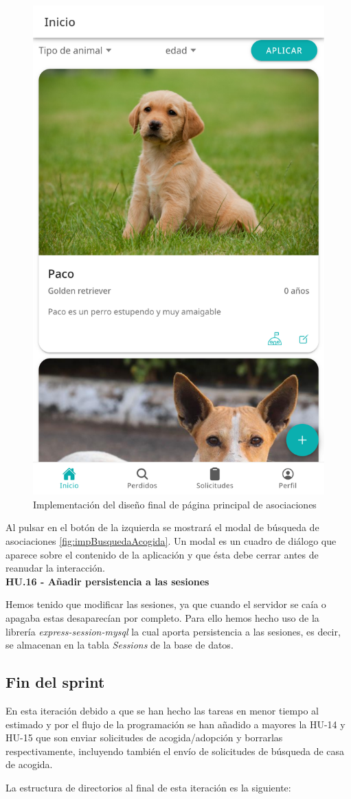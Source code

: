 \begin{figure}[H]
	\centering
	\includegraphics[width=0.31\linewidth]{"sprint 3/homeAsociaciones"}
	\caption{Implementación del diseño final de página principal de asociaciones}
	\label{fig:homeasociaciones}
\end{figure}

Al pulsar en el botón de la izquierda se mostrará el modal de búsqueda de asociaciones \ref{fig:impBusquedaAcogida}. Un modal es un cuadro de diálogo que aparece sobre el contenido de la aplicación y que ésta debe cerrar antes de reanudar la interacción. \\

\Large{\textbf{HU.16 - Añadir persistencia a las sesiones}}

Hemos tenido que modificar las sesiones, ya que cuando el servidor se caía o apagaba estas desaparecían por completo. Para ello hemos hecho uso de la librería \textit{express-session-mysql} \cite{mysqlSession} la cual aporta persistencia a las sesiones, es decir, se almacenan en la tabla \textit{Sessions} de la base de datos. \\

\subsection{Fin del sprint}

En esta iteración debido a que se han hecho las tareas en menor tiempo al estimado y por el flujo de la programación se han añadido a mayores la HU-14 y HU-15 que son enviar solicitudes de acogida/adopción y borrarlas respectivamente, incluyendo también el envío de solicitudes de búsqueda de casa de acogida.

La estructura de directorios al final de esta iteración es la siguiente:

